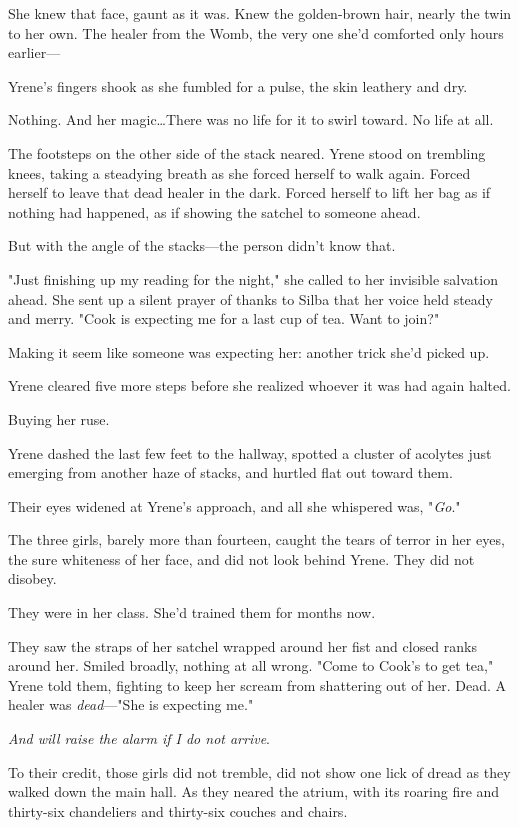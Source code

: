 She knew that face, gaunt as it was.
Knew the golden-brown hair, nearly the twin to her own.
The healer from the Womb, the very one she'd comforted only hours earlier---

Yrene's fingers shook as she fumbled for a pulse, the skin leathery and dry.

Nothing.
And her magic\ldots There was no life for it to swirl toward.
No life at all.

The footsteps on the other side of the stack neared.
Yrene stood on trembling knees, taking a steadying breath as she forced herself to walk again.
Forced herself to leave that dead healer in the dark.
Forced herself to lift her bag as if nothing had happened, as if showing the satchel to someone ahead.

But with the angle of the stacks---the person didn't know that.

"Just finishing up my reading for the night," she called to her invisible salvation ahead.
She sent up a silent prayer of thanks to Silba that her voice held steady and merry.
"Cook is expecting me for a last cup of tea.
Want to join?"

Making it seem like someone was expecting her: another trick she'd picked up.

Yrene cleared five more steps before she realized whoever it was had again halted.

Buying her ruse.

Yrene dashed the last few feet to the hallway, spotted a cluster of acolytes just emerging from another haze of stacks, and hurtled flat out toward them.

Their eyes widened at Yrene's approach, and all she whispered was, "\emph{Go}."

The three girls, barely more than fourteen, caught the tears of terror in her eyes, the sure whiteness of her face, and did not look behind Yrene.
They did not disobey.

They were in her class.
She'd trained them for months now.

They saw the straps of her satchel wrapped around her fist and closed ranks around her.
Smiled broadly, nothing at all wrong.
"Come to Cook's to get tea," Yrene told them, fighting to keep her scream from shattering out of her.
Dead.
A healer was \emph{dead}---"She is expecting me."

\emph{And will raise the alarm if I do not arrive}.

To their credit, those girls did not tremble, did not show one lick of dread as they walked down the main hall.
As they neared the atrium, with its roaring fire and thirty-six chandeliers and thirty-six couches and chairs.

